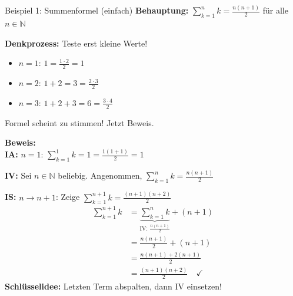 \documentclass[a4paper, fontsize=7pt]{scrartcl}
\def\N{\mathbb{N}}  %
\begin{document}
\begin{mainbox}{Beispiel 1: Summenformel (einfach)}
\textbf{Behauptung:} $\displaystyle \sum_{k=1}^{n} k = \frac{n(n+1)}{2}$ für alle $n \in \N$

\textbf{Denkprozess:} Teste erst kleine Werte!
\begin{itemize}
  \item $n=1$: $1 = \frac{1 \cdot 2}{2} = 1$ \checkmark
  \item $n=2$: $1+2 = 3 = \frac{2 \cdot 3}{2}$ \checkmark
  \item $n=3$: $1+2+3 = 6 = \frac{3 \cdot 4}{2}$ \checkmark
\end{itemize}
Formel scheint zu stimmen! Jetzt Beweis.

\textbf{Beweis:}\\
\textbf{IA:} $n=1$: $\sum_{k=1}^{1} k = 1 = \frac{1(1+1)}{2} = 1$ \checkmark

\textbf{IV:} Sei $n \in \N$ beliebig. Angenommen, $\sum_{k=1}^{n} k = \frac{n(n+1)}{2}$

\textbf{IS:} $n \to n+1$: Zeige $\sum_{k=1}^{n+1} k = \frac{(n+1)(n+2)}{2}$
\begin{align*}
\sum_{k=1}^{n+1} k &= \underbrace{\sum_{k=1}^{n} k}_{\text{IV: } \frac{n(n+1)}{2}} + (n+1)\\
&= \frac{n(n+1)}{2} + (n+1)\\
&= \frac{n(n+1) + 2(n+1)}{2}\\
&= \frac{(n+1)(n+2)}{2} \quad \checkmark
\end{align*}
\textbf{Schlüsselidee:} Letzten Term abspalten, dann IV einsetzen!
\end{mainbox}
\end{document}
